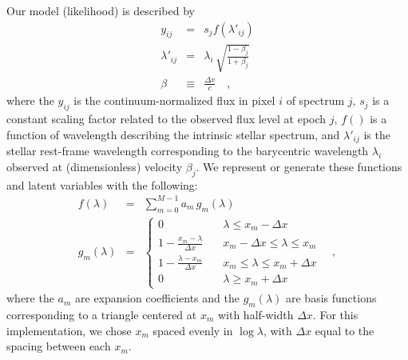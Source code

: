 \documentclass[12pt, letterpaper]{article}
\newcommand{\given}{\,|\,}
\newcommand{\normal}{{\mathcal{N}}}
\begin{document}
Our model (likelihood) is described by
\begin{eqnarray}
   y_{ij} &=& s_j f(\lambda'_{ij})
  \\
  \lambda'_{ij} &=& \lambda_i\,\sqrt{\frac{1 - \beta_j}{1 + \beta_j}}
  \\
  \beta &\equiv& \frac{\Delta v}{c}
  \quad , 
\end{eqnarray}
where the $y_{ij}$ is the continuum-normalized flux in pixel $i$ of
spectrum $j$, $s_j$ is a constant scaling factor related to the observed
flux level at epoch $j$, $f()$ is a function of
wavelength describing the intrinsic stellar spectrum, and
$\lambda'_{ij}$ is the stellar rest-frame wavelength
corresponding to the barycentric wavelength $\lambda_i$ observed at
(dimensionless) velocity $\beta_j$.
We represent or generate these functions and latent variables
with the following:
\begin{eqnarray}
  f(\lambda) &=& \sum_{m=0}^{M-1} a_m\,g_m(\lambda)
  \\
  g_m(\lambda) &=& \left\{
        \begin{array}{ll}
            0 & \quad \lambda \leq x_m -\Delta x \\
            1 - \frac{x_m - \lambda}{\Delta x} & \quad x_m - \Delta x \leq \lambda \leq x_m \\
            1 - \frac{\lambda - x_m}{\Delta x} & \quad x_m \leq \lambda \leq x_m + \Delta x \\
            0 & \quad \lambda \geq x_m + \Delta x \label{eqn:triangle}
        \end{array}
    \right.
  \quad ,
\end{eqnarray}
where the $a_m$ are expansion coefficients and the $g_m(\lambda)$
are basis functions corresponding to a triangle centered at $x_m$ with half-width 
$\Delta x$. For this implementation, we chose $x_m$ spaced evenly in $\log \lambda$, 
with $\Delta x$ equal to the spacing between each $x_m$.
\end{document}
